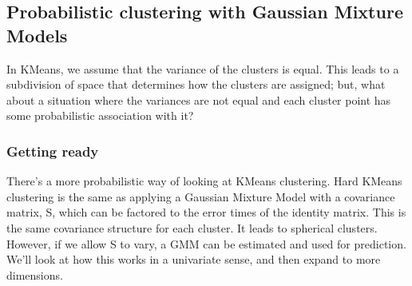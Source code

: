 \documentclass[SKL-MASTER.tex]{subfiles}
\begin{document}
\subsection{Probabilistic clustering with Gaussian Mixture Models}
In KMeans, we assume that the variance of the clusters is equal. This leads to a subdivision
of space that determines how the clusters are assigned; but, what about a situation where the
variances are not equal and each cluster point has some probabilistic association with it?
\subsubsection{Getting ready}
There's a more probabilistic way of looking at KMeans clustering. Hard KMeans clustering
is the same as applying a Gaussian Mixture Model with a covariance matrix, S, which can
be factored to the error times of the identity matrix. This is the same covariance structure
for each cluster. It leads to spherical clusters.
However, if we allow S to vary, a GMM can be estimated and used for prediction. We'll look
at how this works in a univariate sense, and then expand to more dimensions.
\end{document}
